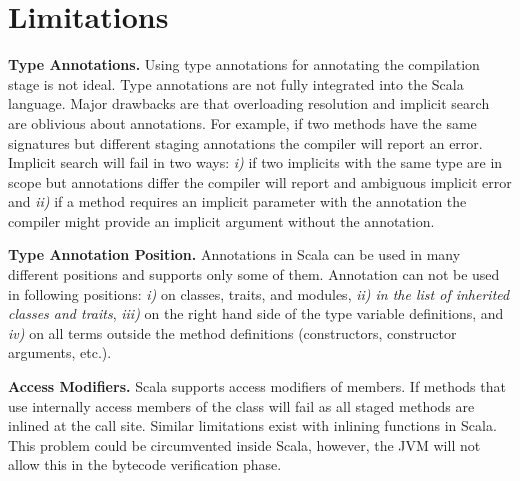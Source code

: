 \section{Limitations}
\label{sct:limitations}

{\bf Type Annotations.} Using type annotations for annotating the compilation stage is not ideal. Type annotations are not fully
 integrated into the Scala language. Major drawbacks are that overloading resolution and implicit search are oblivious about annotations. For example, if two methods have the same signatures but different staging annotations the compiler will report an error. Implicit search will fail in two ways: \emph{i)} if two implicits with the same type are in scope but annotations differ the compiler will report and ambiguous implicit error and \emph{ii)} if a method requires an implicit parameter with the  annotation
 the compiler might provide an implicit argument without the annotation.

{\bf Type Annotation Position.} Annotations in Scala can be used in many different positions and \tool supports only some of them. Annotation  can not be used in following positions: \emph{i)} on classes, traits, and modules, \emph{ii) in the list of inherited classes and traits}, \emph{iii)} on the right hand side of the type variable definitions, and \emph{iv)} on all terms outside the method definitions (constructors, constructor arguments, etc.).

{\bf Access Modifiers.} Scala supports access modifiers of members. If methods that use \tool internally access  members of the class \tool will fail as all staged methods are inlined at the call site. Similar limitations exist with inlining functions in Scala. This problem could be circumvented inside Scala, however, the JVM will not allow this in the bytecode verification phase.
